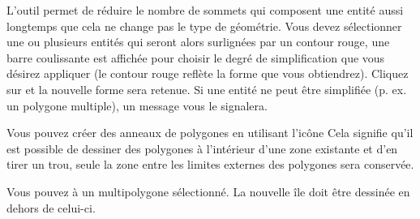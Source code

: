 L'outil  permet de réduire le nombre de sommets qui composent une entité aussi longtemps que cela ne change pas le type de géométrie. Vous devez sélectionner une ou plusieurs entités qui seront alors surlignées par un contour rouge, une barre coulissante est affichée pour choisir le degré de simplification que vous désirez appliquer (le contour rouge reflète la forme que vous obtiendrez). Cliquez sur  et la nouvelle forme sera retenue. Si une entité ne peut être simplifiée (p. ex. un polygone multiple), un message vous le signalera.



Vous pouvez créer des anneaux de polygones en utilisant l'icône  Cela signifie qu'il est possible de dessiner des polygones à l'intérieur d'une zone existante et d'en tirer un trou,  seule la zone entre les limites externes des polygones sera conservée.


Vous pouvez  à un multipolygone sélectionné. La nouvelle île doit être dessinée en dehors de celui-ci.


